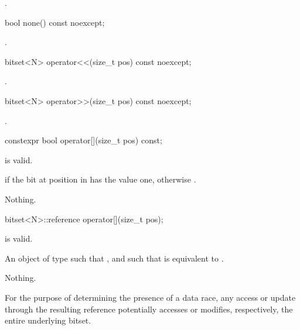 \begin{itemdescr}
\pnum
\returns
{}.
\end{itemdescr}

%
\begin{itemdecl}
bool none() const noexcept;
\end{itemdecl}

\begin{itemdescr}
\pnum
\returns
{}.
\end{itemdescr}

%
\begin{itemdecl}
bitset<N> operator<<(size_t pos) const noexcept;
\end{itemdecl}

\begin{itemdescr}
\pnum
\returns
{}.
\end{itemdescr}

%
\begin{itemdecl}
bitset<N> operator>>(size_t pos) const noexcept;
\end{itemdecl}

\begin{itemdescr}
\pnum
\returns
{}.
\end{itemdescr}

%
\begin{itemdecl}
constexpr bool operator[](size_t pos) const;
\end{itemdecl}

\begin{itemdescr}
\pnum
\expects
{} is valid.

\pnum
\returns
{} if the bit at position  in  has the value
one, otherwise .

\pnum
\throws
Nothing.
\end{itemdescr}

%
\begin{itemdecl}
bitset<N>::reference operator[](size_t pos);
\end{itemdecl}

\begin{itemdescr}
\pnum
\expects
{} is valid.

\pnum
\returns
An object of type
such that
,
and such that
is equivalent to
.

\pnum
\throws
Nothing.

\pnum
\remarks
For the purpose of determining the presence of a data
race, any access or update through the resulting
reference potentially accesses or modifies, respectively, the entire
underlying bitset.
\end{itemdescr}

